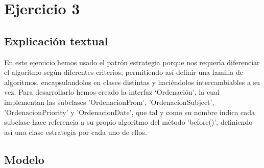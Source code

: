 \documentclass[11pt,a4paper]{article}
\begin{document}







\section{Ejercicio 3}


\subsection{Explicación textual}

En este ejercicio hemos usado el patrón estrategia porque nos requería diferenciar el algoritmo según diferentes criterios, permitiendo así definir una familia de algoritmos, encapsulandolos en clases distintas y haciéndolos intercambiables a su vez. Para desarrollarlo hemos creado la interfaz ‘Ordenación', la cual implementan las subclases 'OrdenacionFrom', 'OrdenacionSubject', 'OrdenacionPriority' y  'OrdenacionDate', que tal y como su nombre indica cada subclase hace referencia a su propio algoritmo del método 'before()', definiendo así una clase estrategia por cada uno de ellos.


\subsection{Modelo}

\begin{figure}[H]
\end{figure}
\end{document}
